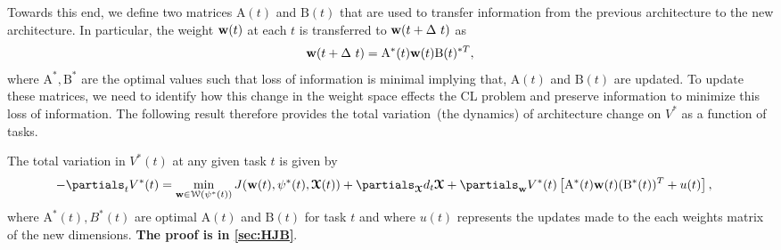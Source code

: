 Towards this end, we define two matrices $\mathrm{A}(t)$ and $\mathrm{B}(t)$ that are used to transfer information from the previous architecture to the new architecture. In particular, the weight $\boldsymbol{\mathrm{w}}(t)$ at each $t$ is transferred to $\boldsymbol{\mathrm{w}}(t+\Delta~t)$ as 
\begin{align}
    \boldsymbol{\mathrm{w}}(t+\Delta~t) = \mathrm{A}^*(t) \boldsymbol{\mathrm{w}}(t) \mathrm{B}(t)^{*T},
\end{align}
 where $\mathrm{A}^*, \mathrm{B}^*$ are the optimal values such that loss of information is minimal implying that, $\mathrm{A}(t)$ and $\mathrm{B}(t)$  are updated. To update these matrices, we need to identify how this change in the weight space effects the CL problem and preserve information to minimize this loss of information. The following result therefore provides the total variation~(the dynamics) of architecture change on $V^*$ as a function of tasks.

\begin{proposition}\label{HJB}
    The total variation in $V^*(t)$ at any given task $t$ is given by
    \begin{align}\label{eq:HJB}
        -\partials_t V^*(t)& = \min_{\weight \in \mathcal{W}(\psi^*(t))} J(\weight(t),\psi^*(t),\tx(t)) + \partials_{\tx}d_{t} \tx+ \partials_{\weight} V^*(t) \left[\mathrm{A}^*(t)\weight(t)( \mathrm{B}^*(t))^T + u(t)\right],
    \end{align}
    where $\mathrm{A}^*(t),B^*(t)$ are optimal $\mathrm{A}(t)$ and $\mathrm{B}(t)$ for task $t$ and where $u(t)$ represents the updates made to the each weights matrix of the new dimensions. \textbf{The proof is in \cref{sec:HJB}}.
\end{proposition}

